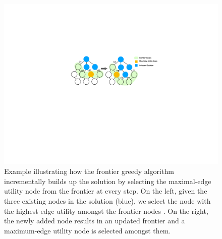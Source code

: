 \begin{figure}[h!]
\centering
\vspace{-10pt}
\includegraphics[width=\linewidth]{figures/frontier_greedy.pdf}
\vspace{-20pt}
\caption{Example illustrating how the frontier greedy algorithm incrementally builds up the solution by selecting the maximal-edge utility node from the frontier at every step. On the left, given the three existing nodes in the solution (blue), we select the node with the highest edge utility  amongst the frontier nodes . On the right, the newly added node results in an updated frontier and a maximum-edge utility node is selected amongst them.}
\vspace{-10pt}
\label{fig:frontier_greedy}
\end{figure}
